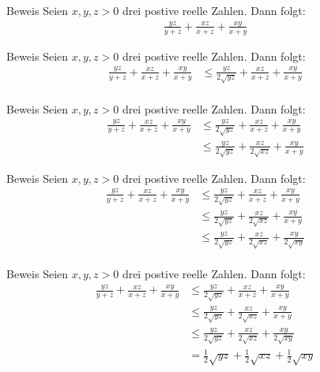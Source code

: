 \documentclass[10pt]{beamer}
\begin{document}
\begin{frame}{Beweis}
    Seien \( x, y, z > 0 \) drei postive reelle Zahlen. Dann folgt:
    \begin{align*}
        \frac{yz}{y + z} + \frac{xz}{x + z} + \frac{xy}{x + y}
    \end{align*}
\end{frame}



\begin{frame}{Beweis}
    Seien \( x, y, z > 0 \) drei postive reelle Zahlen. Dann folgt:
    \begin{align*}
        \frac{yz}{y + z} + \frac{xz}{x + z} + \frac{xy}{x + y}
        & \leq \frac{yz}{2\sqrt{yz}} + \frac{xz}{x + z} + \frac{xy}{x + y} \\
    \end{align*}
\end{frame}



\begin{frame}{Beweis}
    Seien \( x, y, z > 0 \) drei postive reelle Zahlen. Dann folgt:
    \begin{align*}
        \frac{yz}{y + z} + \frac{xz}{x + z} + \frac{xy}{x + y}
        & \leq \frac{yz}{2\sqrt{yz}} + \frac{xz}{x + z} + \frac{xy}{x + y} \\
        & \leq \frac{yz}{2\sqrt{yz}} + \frac{xz}{2\sqrt{xz}} + \frac{xy}{x + y}
    \end{align*}
\end{frame}



\begin{frame}{Beweis}
    Seien \( x, y, z > 0 \) drei postive reelle Zahlen. Dann folgt:
    \begin{align*}
        \frac{yz}{y + z} + \frac{xz}{x + z} + \frac{xy}{x + y}
        & \leq \frac{yz}{2\sqrt{yz}} + \frac{xz}{x + z} + \frac{xy}{x + y} \\
        & \leq \frac{yz}{2\sqrt{yz}} + \frac{xz}{2\sqrt{xz}} + \frac{xy}{x + y} \\
        & \leq \frac{yz}{2\sqrt{yz}} + \frac{xz}{2\sqrt{xz}} + \frac{xy}{2\sqrt{xy}} \\
    \end{align*}
\end{frame}



\begin{frame}{Beweis}
    Seien \( x, y, z > 0 \) drei postive reelle Zahlen. Dann folgt:
    \begin{align*}
        \frac{yz}{y + z} + \frac{xz}{x + z} + \frac{xy}{x + y}
        & \leq \frac{yz}{2\sqrt{yz}} + \frac{xz}{x + z} + \frac{xy}{x + y} \\
        & \leq \frac{yz}{2\sqrt{yz}} + \frac{xz}{2\sqrt{xz}} + \frac{xy}{x + y} \\
        & \leq \frac{yz}{2\sqrt{yz}} + \frac{xz}{2\sqrt{xz}} + \frac{xy}{2\sqrt{xy}} \\
        & = \frac{1}{2}\sqrt{yz} + \frac{1}{2}\sqrt{xz} + \frac{1}{2}\sqrt{xy}
    \end{align*}
\end{frame}
\end{document}
